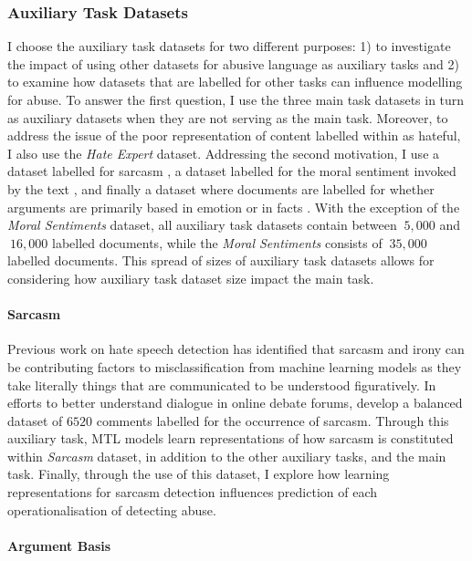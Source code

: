 \subsubsection{Auxiliary Task Datasets}

I choose the auxiliary task datasets for two different purposes: 1) to investigate the impact of using other datasets for abusive language as auxiliary tasks and 2) to examine how datasets that are labelled for other tasks can influence modelling for abuse.
To answer the first question, I use the three main task datasets in turn as auxiliary datasets when they are not serving as the main task. Moreover, to address the issue of the poor representation of content labelled within as hateful, I also use the \textit{Hate Expert} dataset.
Addressing the second motivation, I use a dataset labelled for sarcasm \citep{Oraby_sarcasm:2016}, a dataset labelled for the moral sentiment invoked by the text \citep{Hoover:2019}, and finally a dataset where documents are labelled for whether arguments are primarily based in emotion or in facts \citep{Oraby_factfeel:2015}.
With the exception of the \textit{Moral Sentiments} dataset, all auxiliary task datasets contain between $~5,000$ and $~16,000$ labelled documents, while the \textit{Moral Sentiments} consists of $~35,000$ labelled documents.
This spread of sizes of auxiliary task datasets allows for considering how auxiliary task dataset size impact the main task.

\paragraph{Sarcasm}
Previous work on hate speech detection \citep{Rottger:2021} has identified that sarcasm and irony can be contributing factors to misclassification from machine learning models as they take literally things that are communicated to be understood figuratively.
In efforts to better understand dialogue in online debate forums, \citet{Oraby_sarcasm:2016} develop a balanced dataset of $6520$ comments labelled for the occurrence of sarcasm.
Through this auxiliary task, MTL models learn representations of how sarcasm is constituted within \textit{Sarcasm} dataset, in addition to the other auxiliary tasks, and the main task.
Finally, through the use of this dataset, I explore how learning representations for sarcasm detection influences prediction of each operationalisation of detecting abuse.

\paragraph{Argument Basis}

